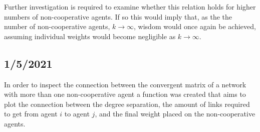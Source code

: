 \documentclass{article}
\begin{document}
Further investigation is required to examine whether this relation holds for higher numbers of non-cooperative agents. If so this would imply that, as the the number of non-cooperative agents, $k \to \infty$, wisdom would once again be achieved, assuming individual weights would become negligible as $k \to \infty$.

\newpage

\subsection{1/5/2021}

In order to inspect the connection between the convergent matrix of a network with more than one non-cooperative agent a function was created that aims to plot the connection between the degree separation, the amount of links required to get from agent $i$ to agent $j$, and the final weight placed on the non-cooperative agents.
\end{document}
